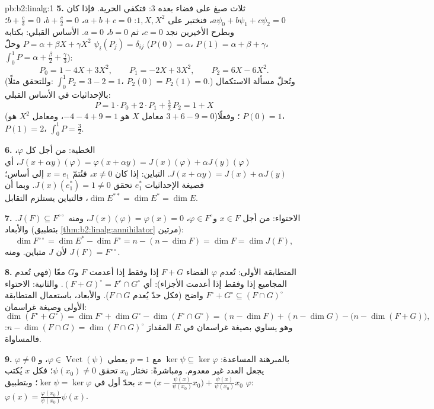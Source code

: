 \begin{solution}{pb:b2:linalg:1}
\textbf{5.} ثلاث صيغ على فضاء بعده $3$: فتكفي
الحرية. فإذا كان $a\psi_0 + b\psi_1 + c\psi_2 = 0$، فنختبر على $1, X,
X^2$: $a + b + c = 0$، $b + \frac c2 = 0$، $b + \frac c3 = 0$؛
وبطرح الأخيرين نجد $c = 0$، ثم $b = 0$، $a = 0$.
الأساس القبلي: بكتابة $P = \alpha + \beta X + \gamma X^2$ وحلّ
$\psi_i(P_j) = \delta_{ij}$ ($P(0) = \alpha$، $P(1) =
\alpha + \beta + \gamma$، $\int_0^1 P = \alpha + \frac\beta2 +
\frac\gamma3$):
\[
P_0 = 1 - 4X + 3X^2, \qquad
P_1 = -2X + 3X^2, \qquad
P_2 = 6X - 6X^2 .
\]
(وللتحقق مثلًا: $\int_0^1 P_2 = 3 - 2 = 1$، $P_2(0) = P_2(1) = 0$.)
وتُحلّ مسألة الاستكمال بالإحداثيات في
الأساس القبلي:
\[
P = 1\cdot P_0 + 2\cdot P_1 + \tfrac32\, P_2 = 1 + X
\]
(معامل $X$ هو $-4 - 4 + 9 = 1$، ومعامل $X^2$ هو $3 + 6 - 9 =
0$)؛ وفعلًا $P(0) = 1$، $P(1) = 2$، $\int_0^1 P = \frac32$.

\textbf{6.} الخطية: من أجل كل $\varphi$، $J(x + \alpha
y)(\varphi) = \varphi(x + \alpha y) = J(x)(\varphi) + \alpha
J(y)(\varphi)$، أي $J(x + \alpha y) = J(x) + \alpha J(y)$. التباين: إذا كان $x \neq 0$،
فنُتمّ $x = e_1$ إلى أساس؛ فصيغة الإحداثيات $e_1^*$ تحقق
$J(x)(e_1^*) = 1 \neq 0$. وبما أن $\dim E^{**} = \dim E^* = \dim
E$، فالتباين يستلزم التقابل.

\textbf{7.} الاحتواء: من أجل $x \in F$ و$\varphi \in F^\circ$،
$J(x)(\varphi) = \varphi(x) = 0$، ومنه $J(F) \subseteq
F^{\circ\circ}$. والأبعاد
(بتطبيق \cref{thm:b2:linalg:annihilator} مرتين):
\[
\dim F^{\circ\circ} = \dim E^* - \dim F^\circ
= n - (n - \dim F) = \dim F = \dim J(F),
\]
لأن $J$ متباين. ومنه $J(F) = F^{\circ\circ}$.

\textbf{8.} المتطابقة الأولى: تُعدم $\varphi$ الفضاء $F + G$ إذا وفقط إذا أعدمت
$F$ و$G$ معًا (فهي تُعدم المجاميع إذا وفقط إذا أعدمت الأجزاء):
أي $(F+G)^\circ = F^\circ \cap G^\circ$. والثانية: الاحتواء
$F^\circ + G^\circ \subseteq (F \cap G)^\circ$ واضح (فكل
حدّ يُعدم $F \cap G$). والأبعاد، باستعمال المتطابقة الأولى
وصيغة غراسمان:
\[
\dim(F^\circ + G^\circ) = \dim F^\circ + \dim G^\circ -
\dim(F^\circ \cap G^\circ)
= (n - \dim F) + (n - \dim G) - \bigl(n - \dim(F +
G)\bigr),
\]
وهو يساوي بصيغة غراسمان في $E$ المقدارَ $n - \dim(F \cap G) = \dim(F
\cap G)^\circ$: فالمساواة.

\textbf{9.} بالمبرهنة المساعدة: $\ker\psi \subseteq \ker\varphi$ مع
$p = 1$ يعطي $\varphi \in \operatorname{Vect}(\psi)$، و
$\varphi \neq 0$ يجعل العدد غير معدوم. ومباشرةً: نختار $x_0$
تحقق $\psi(x_0) \neq 0$؛ فكل $x$ يُكتب $x = \bigl(x -
\frac{\psi(x)}{\psi(x_0)}x_0\bigr) + \frac{\psi(x)}{\psi(x_0)}
x_0$ بحدّ أول في $\ker\psi = \ker\varphi$؛ وبتطبيق
$\varphi$: $\varphi(x) = \frac{\varphi(x_0)}{\psi(x_0)}\psi(x)$.


\end{solution}
